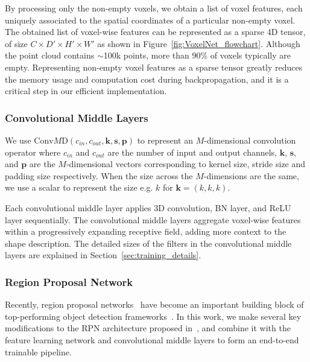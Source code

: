 \documentclass[10pt,twocolumn,letterpaper]{article}
\begin{document}
 By processing only the non-empty voxels, we obtain a list of voxel features, each uniquely associated to the spatial coordinates of a particular non-empty voxel. The obtained list of voxel-wise features can be represented as a sparse 4D tensor, of size $C \times D' \times H' \times W'$ as shown in Figure~\ref{fig:VoxelNet_flowchart}. Although the point cloud contains $\sim$100k points, more than $90\%$ of voxels typically are empty. Representing non-empty voxel features as a sparse tensor greatly reduces the memory usage and computation cost during backpropagation, and it is a critical step in our efficient implementation.






\subsubsection{Convolutional Middle Layers}
We use $\textrm{Conv}M\textrm{D}(c_{in}, c_{out}, \mathbf{k}, \mathbf{s}, \mathbf{p})$ to represent an $M$-dimensional convolution operator where $c_{in}$  and $c_{out}$ are the number of input and output channels, $\mathbf{k}$, $\mathbf{s}$, and $\mathbf{p}$ are the $M$-dimensional vectors corresponding to kernel size, stride size and padding size respectively. When the size across the $M$-dimensions are the same, we use a scalar to represent the size e.g. $k$ for $\mathbf{k} = (k,k,k)$. 

Each convolutional middle layer applies 3D convolution, BN layer, and ReLU layer sequentially. The convolutional middle layers aggregate voxel-wise features within a progressively expanding receptive field, adding more context to the shape description. The detailed sizes of the filters in the convolutional middle layers are explained in Section~\ref{sec:training_details}.




\subsubsection{Region Proposal Network}

 Recently, region proposal networks~\cite{REF:NIPS2015_5638} have become an important building block of top-performing object detection frameworks~\cite{REF:DeepSlidingShapes,REF:cvpr17chen,REF:focalloss}. In this work, we make several key modifications to the  RPN architecture proposed in~\cite{REF:NIPS2015_5638}, and combine it with the feature learning network and convolutional middle layers to form an end-to-end trainable pipeline. 
\end{document}
